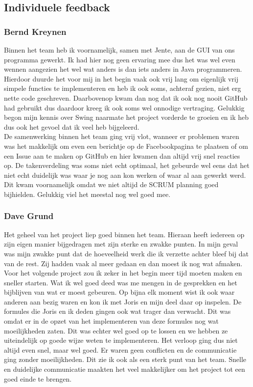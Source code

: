 \documentclass[a4paper,11pt,titlepage]{scrartcl}
\begin{document}
\subsection{Individuele feedback}
\subsubsection{Bernd Kreynen}
Binnen het team heb ik voornamelijk, samen met Jente, aan de GUI van ons programma gewerkt. Ik had hier nog geen ervaring mee dus het was wel even wennen aangezien het wel wat anders is dan iets anders in Java programmeren. Hierdoor duurde het voor mij in het begin vaak ook vrij lang om eigenlijk vrij simpele functies te implementeren en heb ik ook soms, achteraf gezien, niet erg nette code geschreven. Daarbovenop kwam dan nog dat ik ook nog nooit GitHub had gebruikt dus daardoor kreeg ik ook soms wel onnodige vertraging. Gelukkig begon mijn kennis over Swing naarmate het project vorderde te groeien en ik heb dus ook het gevoel dat ik veel heb bijgeleerd.\\
De samenwerking binnen het team ging vrij vlot, wanneer er problemen waren was het makkelijk om even een berichtje op de Facebookpagina te plaatsen of om een Issue aan te maken op GitHub en hier kwamen dan altijd vrij snel reacties op. De takenverdeling was soms niet echt optimaal, het gebeurde wel eens dat het niet echt duidelijk was waar je nog aan kon werken of waar al aan gewerkt werd. Dit kwam voornamelijk omdat we niet altijd de SCRUM planning goed bijhielden. Gelukkig viel het meestal nog wel goed mee.
\subsubsection{Dave Grund}
Het geheel van het project liep goed binnen het team. Hieraan heeft iedereen op zijn eigen manier bijgedragen met zijn sterke en zwakke punten. In mijn geval was mijn zwakke punt dat de hoeveelheid werk die ik verzette achter bleef bij dat van de rest. Zij hadden vaak al meer gedaan en dan moest ik nog wat afmaken. Voor het volgende project zou ik zeker in het begin meer tijd moeten maken en sneller starten. Wat ik wel goed deed was me mengen in de gesprekken en het bijblijven van wat er moest gebeuren. Op bijna elk moment wist ik ook waar anderen aan bezig waren en kon ik met Joris en mijn deel daar op inspelen. De formules die Joris en ik deden gingen ook wat trager dan verwacht. Dit was omdat er in de opzet van het implementeren van deze formules nog wat moeilijkheden zaten. Dit was echter wel goed op te lossen en we hebben ze uiteindelijk op goede wijze weten te implementeren. Het verloop ging dus niet altijd even snel, maar wel goed. Er waren geen conflicten en de communicatie ging zonder moeilijkheden. Dit zie ik ook als een sterk punt van het team. Snelle en duidelijke communicatie maakten het veel makkelijker om het project tot een goed einde te brengen.
\end{document}
